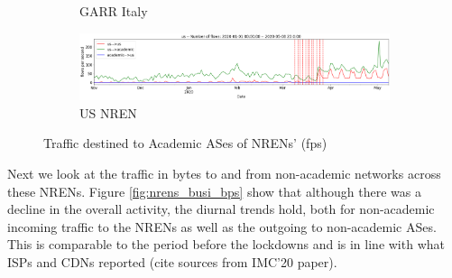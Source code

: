 \documentclass[10pt, journal, letterpaper]{IEEEtran}
\newcommand\linearFigSze{0.48}
\begin{document}
\begin{figure}
\begin{subfigure}{\linearFigSze\textwidth}
          \caption{GARR Italy}
          \label{fig:garr_aca_fps}
    \end{subfigure}
    \begin{subfigure}{\linearFigSze\textwidth}
          \centering
          \includegraphics[width=\columnwidth]{img/us_aca_fps.png}
          \caption{US NREN}
          \label{fig:US_aca_fps}
    \end{subfigure}
    \caption{Traffic destined to Academic ASes of NRENs' (fps)}
    \label{fig:nrens_aca_fps}
\end{figure}

Next we look at the traffic in bytes to and from non-academic networks across these NRENs. Figure \ref{fig:nrens_busi_bps} show that although there was a decline in the overall activity, the diurnal trends hold, both for non-academic incoming traffic to the NRENs as well as the outgoing to non-academic ASes. This is comparable to the period before the lockdowns and is in line with what ISPs and CDNs reported (cite sources from IMC'20 paper).
\end{document}
